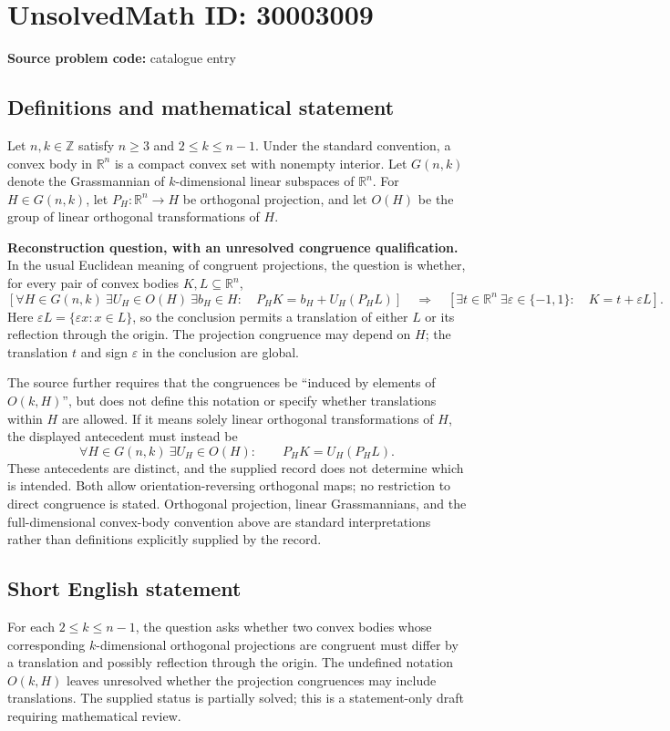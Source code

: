 \documentclass[11pt]{article}
\newcommand{\Z}{\mathbb{Z}}
\newcommand{\R}{\mathbb{R}}
\begin{document}
\section*{UnsolvedMath ID: 30003009}
\textbf{Source problem code:} catalogue entry
\subsection{Definitions and mathematical statement}
Let \(n,k\in\Z\) satisfy \(n\geq3\) and \(2\leq k\leq n-1\). Under the standard convention, a convex body in \(\R^n\) is a compact convex set with nonempty interior. Let \(G(n,k)\) denote the Grassmannian of \(k\)-dimensional linear subspaces of \(\R^n\). For \(H\in G(n,k)\), let \(P_H:\R^n\to H\) be orthogonal projection, and let \(O(H)\) be the group of linear orthogonal transformations of \(H\).

\textbf{Reconstruction question, with an unresolved congruence qualification.} In the usual Euclidean meaning of congruent projections, the question is whether, for every pair of convex bodies \(K,L\subseteq\R^n\),
\[
\left[\forall H\in G(n,k)\ \exists U_H\in O(H)\ \exists b_H\in H:\quad P_HK=b_H+U_H(P_HL)\right]
\quad\Longrightarrow\quad
\left[\exists t\in\R^n\ \exists\varepsilon\in\{-1,1\}:\quad K=t+\varepsilon L\right].
\]
Here \(\varepsilon L=\{\varepsilon x:x\in L\}\), so the conclusion permits a translation of either \(L\) or its reflection through the origin. The projection congruence may depend on \(H\); the translation \(t\) and sign \(\varepsilon\) in the conclusion are global.

The source further requires that the congruences be ``induced by elements of \(O(k,H)\)'', but does not define this notation or specify whether translations within \(H\) are allowed. If it means solely linear orthogonal transformations of \(H\), the displayed antecedent must instead be
\[
\forall H\in G(n,k)\ \exists U_H\in O(H):\qquad P_HK=U_H(P_HL).
\]
These antecedents are distinct, and the supplied record does not determine which is intended. Both allow orientation-reversing orthogonal maps; no restriction to direct congruence is stated. Orthogonal projection, linear Grassmannians, and the full-dimensional convex-body convention above are standard interpretations rather than definitions explicitly supplied by the record.
\subsection{Short English statement}
For each \(2\leq k\leq n-1\), the question asks whether two convex bodies whose corresponding \(k\)-dimensional orthogonal projections are congruent must differ by a translation and possibly reflection through the origin. The undefined notation \(O(k,H)\) leaves unresolved whether the projection congruences may include translations. The supplied status is partially solved; this is a statement-only draft requiring mathematical review.
\end{document}
